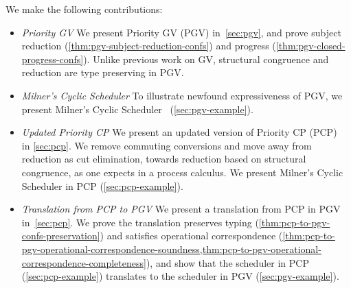 \documentclass[main.tex]{subfiles}
\begin{document}
We make the following contributions:
\begin{itemize}
\item \emph{Priority GV} We present Priority GV (PGV) in~\cref{sec:pgv}, and prove subject reduction (\cref{thm:pgv-subject-reduction-confs}) and progress (\cref{thm:pgv-closed-progress-confs}). Unlike  previous work on GV, structural congruence and reduction are type preserving in PGV.
\item \emph{Milner's Cyclic Scheduler} To illustrate newfound expressiveness of PGV, we present Milner's Cyclic Scheduler~\cite{milner89} (\cref{sec:pgv-example}).
\item \emph{Updated Priority CP} We present an updated version of Priority CP (PCP)~\cite{dardhagay18} in \cref{sec:pcp}. We remove commuting conversions and move away from reduction as cut elimination, towards reduction based on structural congruence, as one expects in a process calculus. We present Milner's Cyclic Scheduler in PCP (\cref{sec:pcp-example}).
\item \emph{Translation from PCP to PGV} We present a translation from PCP in PGV in~\cref{sec:pcp}. We prove the translation preserves typing (\cref{thm:pcp-to-pgv-confs-preservation}) and satisfies operational correspondence (\cref{thm:pcp-to-pgv-operational-correspondence-soundness,thm:pcp-to-pgv-operational-correspondence-completeness}), and show that the scheduler in PCP (\cref{sec:pcp-example}) translates to the scheduler in PGV (\cref{sec:pgv-example}).
\end{itemize}
\end{document}
